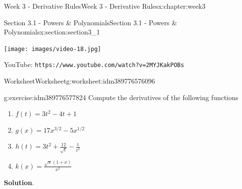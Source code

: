 \documentclass[oneside,10pt,]{book}
\newcommand{\blocktitlefont}{\relax}
\newcommand{\mono}[1]{\texttt{#1}}
\numberwithin{equation}{section}
\newlength{\qrsize}
\newlength{\previewwidth}
\begin{document}
\begin{chapterptx}{Week 3 - Derivative Rules}{}{Week 3 - Derivative Rules}{}{}{x:chapter:week3}
%
%
\typeout{************************************************}
\typeout{************************************************}
%
\begin{sectionptx}{Section 3.1 - Powers \& Polynomials}{}{Section 3.1 - Powers \& Polynomials}{}{}{x:section:section3_1}
\setlength{\qrsize}{9em}
\setlength{\previewwidth}{\linewidth}
\addtolength{\previewwidth}{-\qrsize}
\begin{tcbraster}[raster columns=2, raster column skip=1pt, raster halign=center, raster force size=false, raster left skip=0pt, raster right skip=0pt]%
\begin{tcolorbox}[previewstyle, width=\previewwidth]%
\texttt{[image: images/video-18.jpg]}%
\end{tcolorbox}%
\begin{tcolorbox}[qrstyle]%
{\hypersetup{urlcolor=black}}%
\end{tcolorbox}%
\begin{tcolorbox}[captionstyle]%
\small YouTube: \mono{https://www.youtube.com/watch?v=2MYJKakPOBs}\end{tcolorbox}%
\end{tcbraster}%
%
%
\typeout{************************************************}
\typeout{************************************************}
%
\begin{worksheet-subsection}{Worksheet}{}{Worksheet}{}{}{g:worksheet:idm389776576096}
\begin{divisionexercise}{1}{}{}{g:exercise:idm389776577824}%
Compute the derivatives of the following functions%
%
\begin{enumerate}[label=(\alph*)]
\item{}\(\displaystyle f(t) = 3t^2-4t+1\)%
\item{}\(\displaystyle g(x) = 17x^{3/2} - 5x^{1/2}\)%
\item{}\(\displaystyle h(t) = 3t^2 + \frac{12}{\sqrt t} - \frac{1}{t^2}\)%
\item{}\(\displaystyle k(x) = \frac{\sqrt x (1+x)}{x^2}\)%
\end{enumerate}
\textbf{\blocktitlefont Solution}.\hypertarget{g:solution:idm389856018832}{}\quad{}%
\begin{enumerate}[label=(\alph*)]

\end{enumerate}
\end{divisionexercise}
\end{worksheet-subsection}
\end{sectionptx}
\end{chapterptx}
\end{document}
